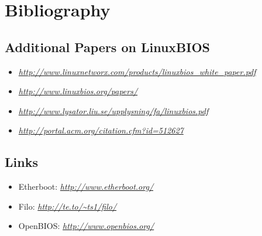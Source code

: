 \documentclass[titlepage,12pt]{article}
\begin{document}
%
%

\section{Bibliography}
\subsection{Additional Papers on LinuxBIOS}

\begin{itemize}
 \item { \small
 \textit{\url{http://www.linuxnetworx.com/products/linuxbios_white_paper.pdf}}
 }
 \item 
 \textit{\url{http://www.linuxbios.org/papers/}}
 \item 
 \textit{\url{http://www.lysator.liu.se/upplysning/fa/linuxbios.pdf}}
 \item 
 \textit{\url{http://portal.acm.org/citation.cfm?id=512627}}
\end{itemize}

\subsection {Links}

\begin{itemize}
 \item Etherboot: \textit{\url{http://www.etherboot.org/}}
 \item Filo: \textit{\url{http://te.to/~ts1/filo/}}
 \item OpenBIOS: \textit{\url{http://www.openbios.org/}}
\end{itemize}
\end{document}
